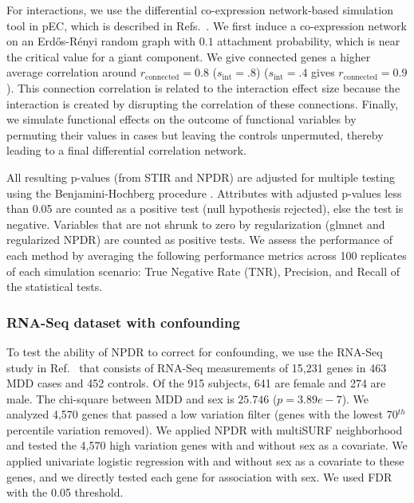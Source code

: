 \documentclass[10pt]{article}
\begin{document}
For interactions, we use the differential co-expression network-based simulation tool in pEC, which is described in Refs.~\cite{le17, lareau15}. We first induce a co-expression network on an Erd\H{o}s-R\'enyi random graph with $0.1$ attachment probability, which is near the critical value for a giant component. We give connected genes a higher average correlation around $r_{\text{connected}}=0.8$ ($s_{\text{int}}=.8$) ($s_{\text{int}}=.4$ gives $r_{\text{connected}}=0.9$).  This connection correlation is related to the interaction effect size because the interaction is created by disrupting the correlation of these connections.  %
Finally, we simulate functional effects on the outcome of functional variables by permuting their values in cases but leaving the controls unpermuted, thereby leading to a final differential correlation network. 

All resulting p-values (from STIR and NPDR) are adjusted for multiple testing using the Benjamini-Hochberg procedure \cite{benjamini01}. Attributes with adjusted p-values less than 0.05 are counted as a positive test (null hypothesis rejected), else the test is negative. Variables that are not shrunk to zero by regularization (glmnet and regularized NPDR) are counted as positive tests. We assess the performance of each method by averaging the following performance metrics across 100 replicates of each simulation scenario: True Negative Rate (TNR), Precision, and Recall of the statistical tests. 

\subsubsection{RNA-Seq dataset with confounding}
To test the ability of NPDR to correct for confounding, we use the RNA-Seq study in Ref.~\cite{mostafavi14} that consists of RNA-Seq measurements of 15,231 genes in 463 MDD cases and 452 controls. Of the 915 subjects, 641 are female and 274 are male. The chi-square between MDD and sex is $25.746$ ($p=3.89e-7$). We analyzed 4,570 genes that passed a low variation filter (genes with the lowest 70$^{th}$ percentile variation removed). We applied NPDR with multiSURF neighborhood and tested the 4,570 high variation genes with and without sex as a covariate. We applied univariate logistic regression with and without sex as a covariate to these genes, and we directly tested each gene for association with sex. We used FDR with the 0.05 threshold. 
\end{document}

